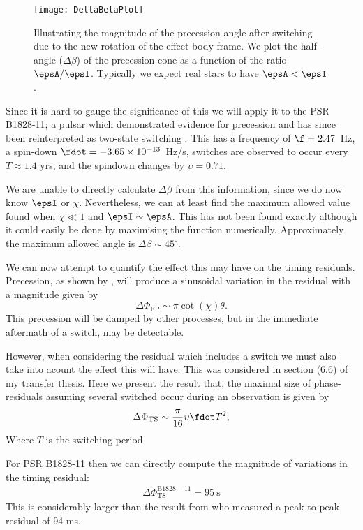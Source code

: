 \documentclass[/home/greg/Thesis/main/main.tex]{subfiles}
\begin{document}
\begin{figure}
    \centering
    \texttt{[image: DeltaBetaPlot]}
    \caption{Illustrating the magnitude of the precession angle after switching
        due to the new rotation of the effect body frame. We plot the half-angle
        ($\Delta\beta$) of the precession cone as a function of the ratio
    $\epsA/\epsI$. Typically we expect real stars to have $\epsA < \epsI$.}
    \label{fig: DeltaBetaPlot}
\end{figure}

Since it is hard to gauge the significance of this we will apply it to the
PSR B1828-11; a pulsar which demonstrated evidence for precession \citet{Stairs2000}
and has since been reinterpreted as two-state switching \citep{Lyne2010}. This
has a frequency of $\f = 2.47$~Hz, a spin-down $\fdot=-3.65\times10^{-13}$~Hz/s, switches are
observed to occur every $T\approx 1.4$ yrs, and the spindown changes by $\upsilon = 0.71$.

We are unable to directly calculate $\Delta\beta$ from this information, since
we do now know $\epsI$ or $\chi$. Nevertheless, we can at least find the maximum
allowed value found when $\chi \ll 1$ and $\epsI \sim \epsA$. This has not 
been found exactly although it could easily be done by maximising the function 
numerically. Approximately the maximum allowed angle is $\Delta\beta \sim 45^{\circ}$.

We can now attempt to quantify the effect this may have on the timing residuals.
Precession, as shown by \citet{Jones2001}, will produce a sinusoidal variation
in the residual with a magnitude given by 
\begin{equation}
    \Delta\Phi_{\mathrm{FP}} \sim \pi \cot(\chi) \theta.
\end{equation}
This precession will be damped by other processes, but in the immediate aftermath
of a switch, may be detectable. 

However, when considering the residual which includes a switch we must also
take into acount the effect this will have. This was considered in section (6.6)
of my transfer thesis. Here we present the result that, the maximal size of phase-residuals
assuming several switched occur during an observation is given by 
\begin{equation}
    \Delta\Phi_{\mathrm{TS}} \sim \frac{\pi}{16} \upsilon \fdot  T^{2},
\end{equation}
Where $T$ is the switching period

For PSR B1828-11 then we can directly compute the magnitude of variations in
the timing residual:
\begin{align}
    \Delta\Phi_{\mathrm{TS}}^{\mathrm{B1828-11}}= 95\mathrm{~s}
\end{align}
This is considerably larger than the result from \citet{Lyne2010} who measured a 
peak to peak residual of 94 ms.


\biblio
\end{document}
